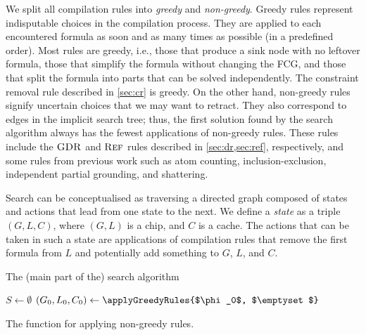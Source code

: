 We split all compilation rules into \emph{greedy} and \emph{non-greedy}. Greedy
rules represent indisputable choices in the compilation process. They are
applied to each encountered formula as soon and as many times as possible (in a
predefined order). Most rules are greedy, i.e., those that produce a sink node
with no leftover formula, those that simplify the formula without changing the
FCG, and those that split the formula into parts that can be solved
independently. The constraint removal rule described in \cref{sec:cr} is greedy.
On the other hand, non-greedy rules signify uncertain choices that we may want
to retract. They also correspond to edges in the implicit search tree; thus, the
first solution found by the search algorithm always has the fewest applications
of non-greedy rules. These rules include the $\operatorname{\textsc{GDR}}$ and $\operatorname{\textsc{Ref}}$ rules described
in \cref{sec:dr,sec:ref}, respectively, and some rules from previous work
\citep{DBLP:conf/ijcai/BroeckTMDR11} such as atom counting, inclusion-exclusion,
independent partial grounding, and shattering.

Search can be conceptualised as traversing a directed graph composed of states
and actions that lead from one state to the next. We define a \emph{state} as a
triple $(G, L, C)$, where $(G, L)$ is a chip, and $C$ is a cache. The actions
that can be taken in such a state are applications of compilation rules that
remove the first formula from $L$ and potentially add something to $G$, $L$, and
$C$.

\begin{algorithm}
  \caption{The (main part of the) search algorithm}\label{alg:search}
   $S \gets \emptyset$\;
  $(G_0, L_0, C_{0}) \gets \applyGreedyRules{$\phi_0$, $\emptyset$}$\;\label{line:greedy}
\end{algorithm}

\begin{algorithm}
  \caption{The function for applying non-greedy rules.}\label{alg:applyallrules}
\end{algorithm}

